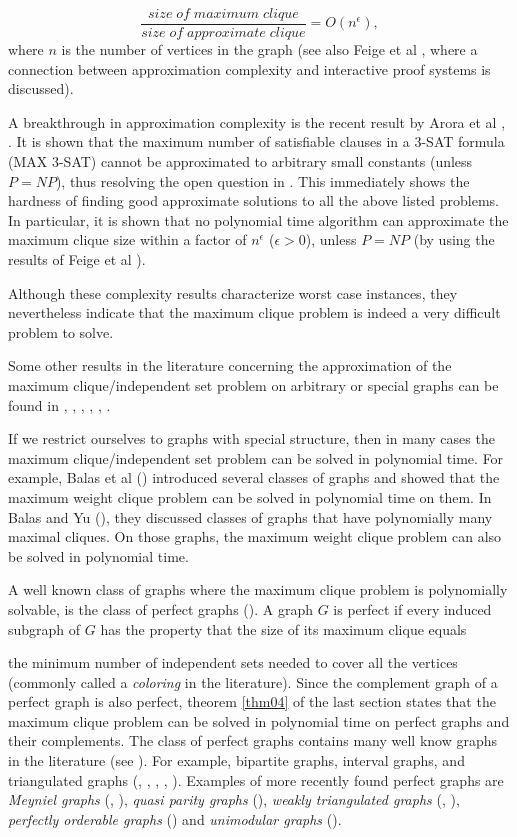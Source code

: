 \[ \mbox{} \frac{size \; of \; maximum \; clique}{size \; of \;
 approximate \; clique} = O(n^{\epsilon}), \]
where $n$ is the number of vertices in the graph (see also Feige et
al \cite{FeGoLoSaSz91}, where a connection between approximation
complexity and interactive proof systems is discussed). 


A breakthrough in approximation complexity is the recent result by
Arora et al \cite{ArLuMo92}, \cite{ArSa92}. It is shown that the
maximum number of satisfiable clauses in a 3-SAT formula (MAX 3-SAT)
cannot be approximated to arbitrary small constants (unless $P =
NP$), thus resolving the open question in \cite{PaYa88}. This
immediately shows the hardness of finding good approximate solutions
to all the above listed problems. In particular, it is shown that no
polynomial time algorithm can approximate the maximum clique size
within a factor of $n^{\epsilon}$ ($\epsilon > 0$), unless $P = NP$
(by using the results of Feige et al \cite{FeGoLoSaSz91}).

Although these complexity results characterize worst case instances,
they nevertheless indicate that the maximum clique problem is indeed
a very difficult problem to solve.

Some other results in the literature concerning the approximation of
the maximum clique/independent set problem on arbitrary or special
graphs can be found in \cite{BoHa90}, \cite{ChNiSa82},
\cite{ChFr86}, \cite{CrFiSi91}, \cite{Mur92}, \cite{Rag88}.

If we restrict ourselves to graphs with special structure, then in
many cases the maximum clique/independent set problem can be solved
in polynomial time. For example, Balas et al (\cite{BaChNe87})
introduced several classes of graphs and showed that the maximum
weight clique problem can be solved in polynomial time on them. In
Balas and Yu (\cite{BaYu89}), they discussed classes of graphs that
have polynomially many maximal cliques. On those graphs, the maximum
weight clique problem can also be solved in polynomial time.

A well known class of graphs where the maximum clique problem is
polynomially solvable, is the class of perfect graphs
(\cite{BeCh84}). A graph $G$ is perfect if every induced subgraph of
$G$ has the property that the size of its maximum clique equals 

the minimum number of independent sets needed to cover all the
vertices (commonly called a {\em coloring} in the literature). Since
the complement graph of a perfect graph is also perfect, theorem
\ref{thm04} of the last section states that the maximum clique
problem can be solved in polynomial time on perfect graphs and their
complements. The class of perfect graphs contains many well know
graphs in the literature (see \cite{Gol80}). For example, bipartite
graphs, interval graphs, and triangulated graphs (\cite{Gav72},
\cite{Fra76}, \cite{Ros70}, \cite{RoTaLe76}, \cite{TaYa84}).
Examples of more recently found perfect graphs are {\em Meyniel
graphs} (\cite{Mey76}, \cite{BuFo84}), {\em quasi parity graphs}
(\cite{Mey85}), {\em weakly triangulated graphs} (\cite{Hay85},
\cite{HaHoMa90}), {\em perfectly orderable graphs} (\cite{Chv85})
and {\em unimodular graphs} (\cite{Hel57}).

